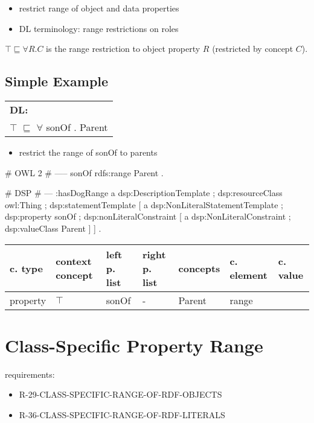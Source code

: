 \documentclass{llncs}
\newenvironment{gcotable}{
  \scriptsize
  \sffamily
  \vspace{0.3cm}
  \begin{tabular}{l|l|l|l|l|l|l}
  \hline
  \textbf{c. type} & \textbf{context concept} & \textbf{left p. list} & \textbf{right p. list} & \textbf{concepts} & \textbf{c. element} & \textbf{c. value} \\
  \hline

}{
  \hline
  \end{tabular}
  \linebreak
}
\newenvironment{DL}{
  \scriptsize
  \sffamily
  \vspace{0.3cm}
  \begin{tabular}{l}
	\textbf{DL:} \\

}{
  \end{tabular}
  \linebreak
}
\begin{document}
\begin{itemize}
	\item restrict range of object and data properties
	\item DL terminology: range restrictions on roles
\end{itemize}

$\top \sqsubseteq \forall R . C$ is the range restriction to object property $R$ (restricted by concept $C$).  



\subsection{Simple Example}

\begin{DL}
$\top$ $\sqsubseteq$ $\forall$ sonOf . Parent 
\end{DL}

\begin{itemize}
	\item restrict the range of sonOf to parents
\end{itemize}

\begin{ex}
# OWL 2
# -----
sonOf rdfs:range Parent . 
\end{ex}

\begin{ex}
# DSP
# ---
:hasDogRange
        a dsp:DescriptionTemplate ; 
        dsp:resourceClass owl:Thing ; 
        dsp:statementTemplate [
            a dsp:NonLiteralStatementTemplate ;
            dsp:property sonOf ; 
            dsp:nonLiteralConstraint [ 
                a dsp:NonLiteralConstraint ;
                dsp:valueClass Parent ] ] .
\end{ex}

\begin{gcotable}
property & $\top$ & sonOf & - & Parent & range \\
\end{gcotable}

\section{Class-Specific Property Range}

requirements:

\begin{itemize}
	\item R-29-CLASS-SPECIFIC-RANGE-OF-RDF-OBJECTS
	\item R-36-CLASS-SPECIFIC-RANGE-OF-RDF-LITERALS
\end{itemize}
\end{document}
